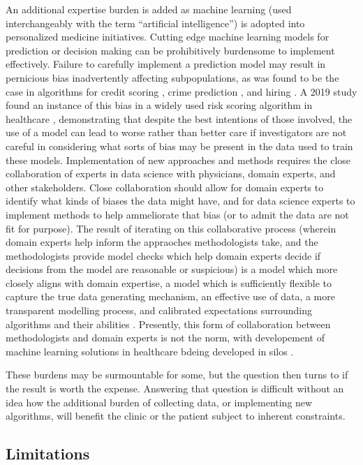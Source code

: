 An additional expertise burden is added as machine learning (used interchangeably with the term “artificial intelligence”) is adopted into personalized medicine initiatives.  Cutting edge machine learning models for prediction or decision making can be prohibitively burdensome to implement effectively. Failure to carefully implement a prediction model may result in pernicious bias inadvertently affecting subpopulations, as was found to be the case in algorithms for credit scoring \cite{barocas2016big}, crime prediction \cite{lum2016predict}, and hiring \cite{ajunwa2020paradox}.  A 2019 study found an instance of this bias in a widely used risk scoring algorithm in healthcare \cite{obermeyer2019dissecting}, demonstrating that despite the best intentions of those involved, the use of a model can lead to worse rather than better care if investigators are not careful in considering what sorts of bias may be present in the data used to train these models.  Implementation of new approaches and methods requires the close collaboration of experts in data science  with physicians, domain experts, and other stakeholders.  Close collaboration should allow for domain experts to identify what kinds of biases the data might have, and for data science experts to implement methods to help ammeliorate that bias (or to admit the data are not fit for purpose).  The result of iterating on this collaborative process (wherein domain experts help inform the appraoches methodologists take, and the methodologists provide model checks which help domain experts decide if decisions from the model are reasonable or suspicious) is a model which more closely aligns with domain expertise, a model which is sufficiently flexible to capture the true data generating mechanism, an effective use of data, a more transparent modelling process, and calibrated expectations surrounding algorithms and their abilities \cite{frohlich2018hype}.  Presently, this form of collaboration between methodologists and domain experts is not the norm, with developement of machine learning solutions in healthcare bdeing developed in silos \cite{wiens2019no}.

These burdens may be surmountable for some, but the question then turns to if the result is worth the expense.  Answering that question is difficult without an idea how the additional burden of collecting data, or implementing new algorithms, will benefit the clinic or the patient subject to inherent constraints. 



\subsection{Limitations}

